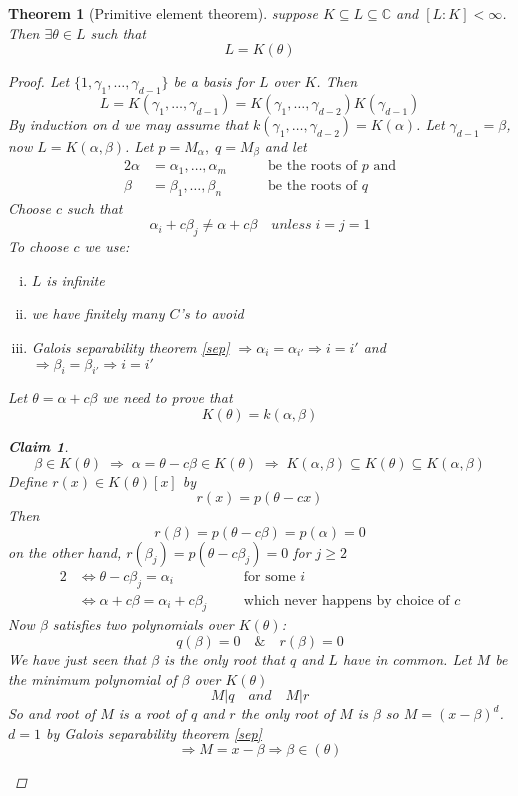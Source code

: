 \documentclass[12pt]{article}
\def\CC{\mathbb{C}}
\newtheorem{theorem}{Theorem}[section]
\newtheorem*{claim}{Claim}
\begin{document}
\begin{theorem}[Primitive element theorem]
suppose $K \subseteq L \subseteq \CC$ and $[L:K]<\infty$. Then $\exists \theta \in L$  such that
\[L = K(\theta) \]
\begin{proof}
Let $\{ 1 , \gamma_1 , \dots , \gamma_{d-1}\}$ be a basis for $L$ over $K$. Then 
\[ L = K(\gamma_1 , \dots , \gamma_{d-1}) = K(\gamma_1 , \dots , \gamma_{d-2})K(\gamma_{d-1}) \]
By induction on $d$ we may assume that $k(\gamma_1 , \dots , \gamma_{d-2}) = K(\alpha)$. Let $\gamma_{d-1} = \beta$, now $L= K(\alpha, \beta)$. Let $p=M_{\alpha} , \; q= M_{\beta}$ and let
\begin{alignat*}{2}
\alpha &= \alpha_1 , \dots, \alpha_{m}&\quad  &\text{ be the roots of $p$ and}\\
\beta &= \beta_1 , \dots, \beta_{n} &\quad &\text{ be the roots of $q$}
\end{alignat*}
Choose $c$ such that 
\[ \alpha_i + c\beta_j \neq \alpha + c\beta \quad unless \; i=j=1\]
To choose $c$ we use: 
\begin{enumerate}[(i)] 
\item $L$ is infinite 
\item we have finitely many $C$'s to avoid 
\item Galois separability theorem \ref{sep} $\Rightarrow \alpha_i = \alpha_{i'} \Rightarrow i=i'$ and $\Rightarrow \beta_i = \beta_{i'} \Rightarrow i=i'$
\end{enumerate} 
Let $\theta = \alpha + c\beta$ we need to prove that
\[ K(\theta) = k(\alpha ,\beta) \]
\begin{claim}
\[\beta \in K(\theta) \; \Rightarrow \; \alpha= \theta - c\beta \in K(\theta) \; \Rightarrow \; K(\alpha , \beta) \subseteq K(\theta) \subseteq K(\alpha , \beta) \]
Define $r(x) \in K(\theta)[x]$ by 
\[r(x) = p(\theta - cx)\]
Then 
\[r(\beta) = p(\theta - c\beta) = p(\alpha) = 0\]
on the other hand, $r(\beta_j) = p(\theta - c\beta_j) =0$ for $j \geq 2$
\begin{alignat*}{2}
&\Leftrightarrow \theta - c\beta_j = \alpha_i &\quad &\text{for some $i$}\\
&\Leftrightarrow \alpha + c\beta = \alpha_i + c\beta_j &\quad &\text{which never happens by choice of $c$}
\end{alignat*}
Now $\beta$ satisfies two polynomials over $K(\theta)$:
\[q(\beta) = 0 \quad \& \quad r(\beta)=0 \]
We have just seen that $\beta$ is the only root that $q$ and $L$ have in common. Let $M$ be the minimum polynomial of $\beta$ over $K(\theta)$
\[M|q \quad and \quad M|r\]
So and root of $M$ is a root of $q$ and $r$ the only root of $M$ is $\beta$ so $M=(x-\beta)^d$. $d = 1$ by Galois separability theorem \ref{sep} 
\[\Rightarrow M = x-\beta \Rightarrow \beta \in (\theta)\]
\end{claim}
\end{proof}
\end{theorem}
\end{document}
